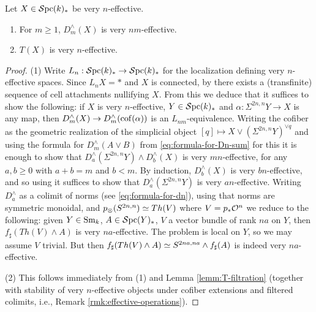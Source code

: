 \documentclass{amsart}
\numberwithin{proposition}{section}
\numberwithin{equation}{section}
\begin{document}
\begin{lemma} \label{lemm:Dn-effectivity-Spc*}
Let $X \in \mathcal{S}\mathrm{pc}{}(k)_*$ be very $n$-effective.
\begin{enumerate}
\item For $m \ge 1$, $D_m^\wedge(X)$ is very $nm$-effective.
\item $T(X)$ is very $n$-effective.
\end{enumerate}
\end{lemma}
\begin{proof}
(1) Write $L_n: \mathcal{S}\mathrm{pc}{}(k)_* \to \mathcal{S}\mathrm{pc}{}(k)_*$ for the localization defining very $n$-effective spaces.
Since $L_n X = *$ and $X$ is connected, by \cite[Construction 3.1.17]{freudenthal} there exists a (transfinite) sequence of cell attachments nullifying $X$.
From this we deduce that it suffices to show the following: if $X$ is very $n$-effective, $Y \in \mathcal{S}\mathrm{pc}{}(k)_*$ and $\alpha: \Sigma^{2n,n}Y \to X$ is any map, then $D_m^\wedge(X) \to D_m^\wedge(\operatorname{cof}(\alpha))$ is an $L_{nm}$-equivalence.
Writing the cofiber as the geometric realization of the simplicial object $[q] \mapsto X \vee (\Sigma^{2n,n}Y)^{\vee q}$ and using the formula for $D_m^\wedge(A \vee B)$ from \eqref{eq:formula-for-Dn-sum} for this it is enough to show that $D_a^\wedge(\Sigma^{2n,n}Y) \wedge D_b^\wedge(X)$ is very $mn$-effective, for any $a,b \ge 0$ with $a+b=m$ and $b<m$.
By induction, $D_b^\wedge(X)$ is very $bn$-effective, and so using \cite[Theorem 3.1.20]{freudenthal} it suffices to show that $D_a^\wedge(\Sigma^{2n,n}Y)$ is very $an$-effective.
Writing $D_a^\wedge$ as a colimit of norms (see \eqref{eq:formula-for-dn}), using that norms are symmetric monoidal, and $p_\otimes(S^{2n,n}) \simeq Th(V)$ where $V = p_* \mathcal O^n$ \cite[Lemma 4.4]{bachmann-norms} we reduce to the following: given $Y \in {\mathrm{S}\mathrm{m}}_k$, $A \in \mathcal{S}\mathrm{pc}{}(Y)_*$, $V$ a vector bundle of rank $na$ on $Y$, then $f_\sharp(Th(V) \wedge A)$ is very $na$-effective.
The problem is local on $Y$, so we may assume $V$ trivial.
But then $f_\sharp(Th(V) \wedge A) \simeq S^{2na,na} \wedge f_\sharp(A)$ is indeed very $na$-effective.

(2) This follows immediately from (1) and Lemma \ref{lemm:T-filtration} (together with stability of very $n$-effective objects under cofiber extensions and filtered colimits, i.e., Remark \ref{rmk:effective-operations}).
\end{proof}
\end{document}

